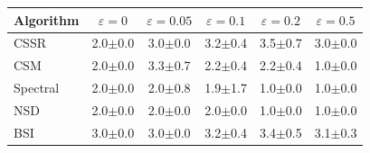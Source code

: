 \begin{tabular}{lccccc}
\toprule
\textbf{Algorithm} & \textbf{$\varepsilon=0$} & \textbf{$\varepsilon=0.05$} & \textbf{$\varepsilon=0.1$} & \textbf{$\varepsilon=0.2$} & \textbf{$\varepsilon=0.5$} \\
\midrule
CSSR & 2.0$\pm$0.0 & 3.0$\pm$0.0 & 3.2$\pm$0.4 & 3.5$\pm$0.7 & 3.0$\pm$0.0 \\
CSM & 2.0$\pm$0.0 & 3.3$\pm$0.7 & 2.2$\pm$0.4 & 2.2$\pm$0.4 & 1.0$\pm$0.0 \\
Spectral & 2.0$\pm$0.0 & 2.0$\pm$0.8 & 1.9$\pm$1.7 & 1.0$\pm$0.0 & 1.0$\pm$0.0 \\
NSD & 2.0$\pm$0.0 & 2.0$\pm$0.0 & 2.0$\pm$0.0 & 1.0$\pm$0.0 & 1.0$\pm$0.0 \\
BSI & 3.0$\pm$0.0 & 3.0$\pm$0.0 & 3.2$\pm$0.4 & 3.4$\pm$0.5 & 3.1$\pm$0.3 \\
\bottomrule
\end{tabular}
